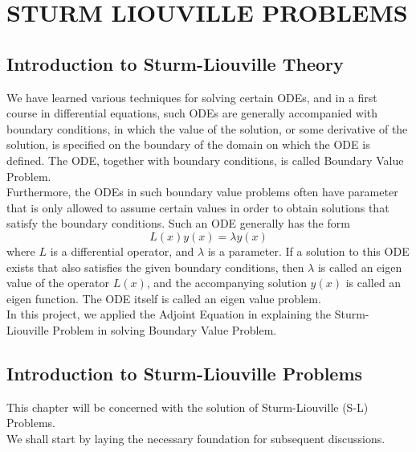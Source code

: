 \documentclass[12pt]{report}
\newcommand{\sps}{\\[0.2cm]}
\newcommand{\NI}{\noindent}
\begin{document}
	\chapter{STURM LIOUVILLE PROBLEMS}
	\section{Introduction to Sturm-Liouville Theory}
	We have learned various techniques for solving certain ODEs, and in a first course in differential equations, such ODEs are generally accompanied with boundary conditions, in which the value of the solution, or some derivative of the solution, is specified on the boundary of the domain on which the ODE is defined. The ODE, together with boundary conditions, is called Boundary Value Problem.\sps
	
	\NI Furthermore, the ODEs in such boundary value problems often have parameter that is only allowed to assume certain values in order to obtain solutions that satisfy the boundary conditions. Such an ODE generally has the form 
	\begin{equation*}
		L(x)y(x) = \lambda y(x)
	\end{equation*}
	where $L$ is a differential operator, and $\lambda$ is a parameter. If a solution to this ODE exists that also satisfies the given boundary conditions, then $\lambda$ is called an eigen value of the operator $L(x)$, and the accompanying solution $y(x)$ is called an eigen function. The ODE itself is called an eigen value problem.\sps
	
	\NI In this project, we applied the Adjoint Equation in explaining the Sturm-Liouville Problem in solving Boundary Value Problem.
	
	
	\section{Introduction to Sturm-Liouville Problems}
	This chapter will be concerned with the solution of Sturm-Liouville (S-L) Problems.\sps
	We shall start by laying the necessary foundation for subsequent discussions.
	
	
\end{document}
